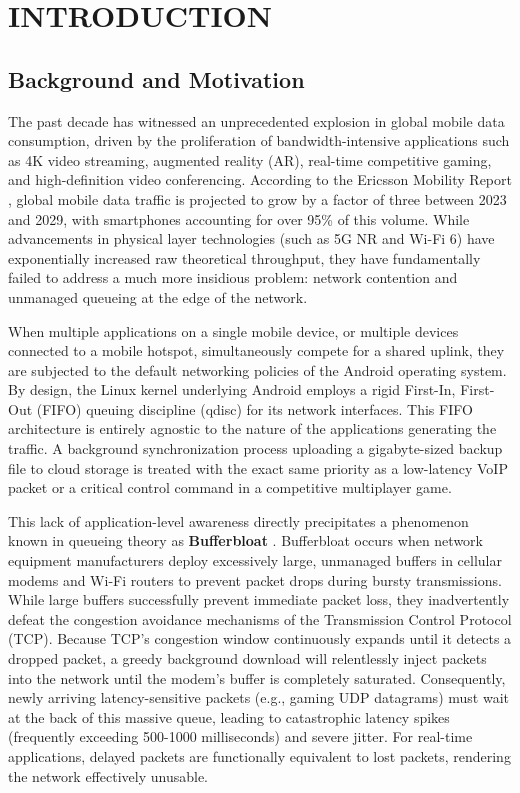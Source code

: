 
\chapter{INTRODUCTION}
\label{chap:intro}

\section{Background and Motivation}
\label{sec:background}

The past decade has witnessed an unprecedented explosion in global mobile data consumption, driven by the proliferation of bandwidth-intensive applications such as 4K video streaming, augmented reality (AR), real-time competitive gaming, and high-definition video conferencing. According to the Ericsson Mobility Report \cite{ericsson_2024}, global mobile data traffic is projected to grow by a factor of three between 2023 and 2029, with smartphones accounting for over 95\% of this volume. While advancements in physical layer technologies (such as 5G NR and Wi-Fi 6) have exponentially increased raw theoretical throughput, they have fundamentally failed to address a much more insidious problem: network contention and unmanaged queueing at the edge of the network.

When multiple applications on a single mobile device, or multiple devices connected to a mobile hotspot, simultaneously compete for a shared uplink, they are subjected to the default networking policies of the Android operating system. By design, the Linux kernel underlying Android employs a rigid First-In, First-Out (FIFO) queuing discipline (qdisc) for its network interfaces. This FIFO architecture is entirely agnostic to the nature of the applications generating the traffic. A background synchronization process uploading a gigabyte-sized backup file to cloud storage is treated with the exact same priority as a low-latency VoIP packet or a critical control command in a competitive multiplayer game.

This lack of application-level awareness directly precipitates a phenomenon known in queueing theory as \textbf{Bufferbloat} \cite{gettys_2012}. Bufferbloat occurs when network equipment manufacturers deploy excessively large, unmanaged buffers in cellular modems and Wi-Fi routers to prevent packet drops during bursty transmissions. While large buffers successfully prevent immediate packet loss, they inadvertently defeat the congestion avoidance mechanisms of the Transmission Control Protocol (TCP). Because TCP's congestion window continuously expands until it detects a dropped packet, a greedy background download will relentlessly inject packets into the network until the modem's buffer is completely saturated. Consequently, newly arriving latency-sensitive packets (e.g., gaming UDP datagrams) must wait at the back of this massive queue, leading to catastrophic latency spikes (frequently exceeding 500-1000 milliseconds) and severe jitter. For real-time applications, delayed packets are functionally equivalent to lost packets, rendering the network effectively unusable.

